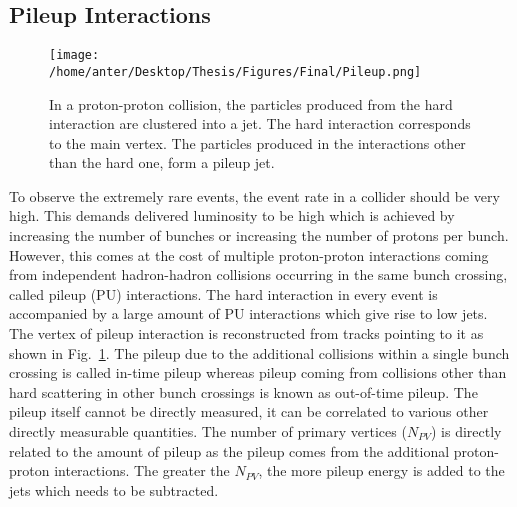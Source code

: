 \subsection{Pileup Interactions}
\begin{figure}[!h]
 \begin{center}
 \vspace*{0mm} 
 \texttt{[image: /home/anter/Desktop/Thesis/Figures/Final/Pileup.png]}\\
 \vspace*{5mm}
 \caption[In a proton-proton collision, the particles produced from the hard interaction are clustered into a jet. The hard interaction corresponds to the main vertex. The particles produced in the interactions other than the hard one, form a pileup jet.]{In a proton-proton collision, the particles produced from the hard interaction are clustered into a jet. The hard interaction corresponds to the main vertex. The particles produced in the interactions other than the hard one, form a pileup jet\footnotemark.}
 \label{fig:pileup_d}
 \end{center}
\end{figure}

To observe the extremely rare events, the event rate in a collider should be very high. This demands delivered luminosity to be high which is achieved by increasing the number of bunches or increasing the number of protons per bunch. However, this comes at the cost of multiple proton-proton interactions coming from independent hadron-hadron collisions occurring in the same bunch crossing, called pileup (PU) interactions. The hard interaction in every event is accompanied by a large amount of PU interactions which give rise to low \pt jets. The vertex of pileup interaction is reconstructed from tracks pointing to it as shown in Fig.~\ref{fig:pileup_d}. The pileup due to the additional collisions within a single bunch crossing is called in-time pileup whereas pileup coming from collisions other than hard scattering in other bunch crossings is known as out-of-time pileup. The pileup itself cannot be directly measured, it can be correlated to various other directly measurable quantities. The number of primary vertices ($N_{PV}$) is directly related to the amount of pileup as the pileup comes from the additional proton-proton interactions. The greater the $N_{PV}$, the more pileup energy is added to the jets which needs to be subtracted. 

